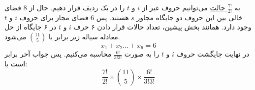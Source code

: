 \p
به
\underline{$\frac{7!}{2!}$ حالت}  
می‌توانیم حروف غیر از $i$ و $t$ را در یک ردیف قرار دهیم. حال از 8 فضای خالی بین این حروف دو جایگاه مجاور $s$ هستند. پس 6 فضای مجاز برای حروف $i$ و $t$ وجود دارد.
همانند بخش پیشین، تعداد حالات قرار دادن ۶ حرف 
$i$ و $t$
 در ۶ جایگاه از حل معادله سیاله زیر برابر با 
 \underline{$\binom{11}{5}$}
می‌شود.
$$x_1 + x_2 \ldots + x_6 = 6$$
در نهایت جایگشت حروف 
$i$ و $t$ 
را 
به صورت 
\underline{$\frac{6!}{3!3!}$}
محاسبه می‌کنیم.
پس جواب آخر برابر است با:
$$\frac{7!}{2!}\times\binom{11}{5}\times\frac{6!}{3!3!}$$
